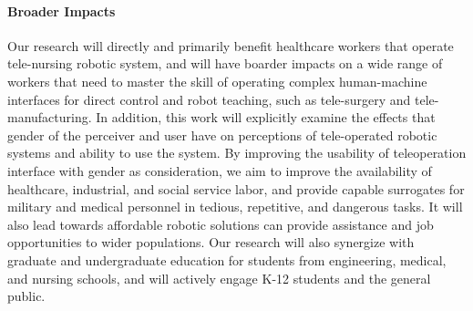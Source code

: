 \vspace{0.5 em}

\paragraph*{\Large Broader Impacts}
Our research will directly and primarily benefit healthcare workers that operate tele-nursing robotic system, and will have boarder impacts on a wide range of workers that need to master the skill of operating complex human-machine interfaces for direct control and robot teaching, such as tele-surgery and tele-manufacturing. In addition, this work will explicitly examine the effects that gender of the perceiver and user have on perceptions of tele-operated robotic systems and ability to use the system. By improving the usability of teleoperation interface with gender as consideration, we aim to improve the availability of healthcare, industrial, and social service labor, and provide capable surrogates for military and medical personnel in tedious, repetitive, and dangerous tasks. It will also lead towards affordable robotic solutions can provide assistance and job opportunities to wider populations. Our research will also synergize with graduate and undergraduate education for students from engineering, medical, and nursing schools, and will actively engage K-12 students and the general public. 





